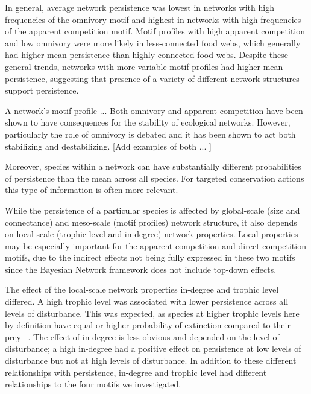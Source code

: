 \documentclass[12pt]{article}
\begin{document}
\begin{spacing}{2.0}
In general, average network persistence was lowest in networks with high frequencies of the omnivory motif and highest in networks with high frequencies of the apparent competition motif. 
Motif profiles with high apparent competition and low omnivory were more likely in less-connected food webs, which generally had higher mean persistence than highly-connected food webs.
Despite these general trends, networks with more variable motif profiles had higher mean persistence, suggesting that presence of a variety of different network structures support persistence. 

A network's motif profile ... Both omnivory and apparent competition have been shown to have consequences for the stability of ecological networks. However, particularly the role of omnivory is debated and it has been shown to act both stabilizing and destabilizing. [Add examples of both ... ]

Moreover, species within a network can have substantially different probabilities of persistence than the mean across all species. For targeted conservation actions this type of information is often more relevant. 

While the persistence of a particular species is affected by global-scale (size and connectance) and meso-scale (motif profiles) network structure, it also depends on local-scale (trophic level and in-degree) network properties.
Local properties may be especially important for the apparent competition and direct competition motifs, due to the indirect effects not being fully expressed in these two motifs since the Bayesian Network framework does not include top-down effects. 

The effect of the local-scale network properties in-degree and trophic level differed.
A high trophic level was associated with lower persistence across all levels of disturbance. This was expected, as species at higher trophic levels here by definition have equal or higher probability of extinction compared to their prey ~\citep{Eklof2013}.
The effect of in-degree is less obvious and depended on the level of disturbance; a high in-degree had a positive effect on persistence at low levels of disturbance but not at high levels of disturbance.
In addition to these different relationships with persistence, in-degree and trophic level had different relationships to the four motifs we investigated.


\end{spacing}
\end{document}
